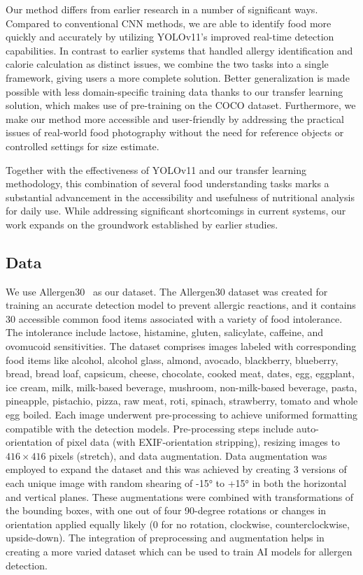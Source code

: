 \documentclass[10pt,twocolumn,letterpaper]{article}
\begin{document}
Our method differs from earlier research in a number of significant ways. Compared to conventional CNN methods, we are able to identify food more quickly and accurately by utilizing YOLOv11's\cite{redmon2016lookonceunifiedrealtime} improved real-time detection capabilities. 
In contrast to earlier systems that handled allergy identification and calorie calculation as distinct issues, we combine the two tasks into a single framework, giving users a more complete solution. 
Better generalization is made possible with less domain-specific training data thanks to our transfer learning solution, which makes use of pre-training on the COCO\cite{lin2015microsoftcococommonobjects} dataset. 
Furthermore, we make our method more accessible and user-friendly by addressing the practical issues of real-world food photography without the need for reference objects or controlled settings for size estimate.

Together with the effectiveness of YOLOv11 and our transfer learning methodology, this combination of several food understanding tasks marks a substantial advancement in the accessibility and usefulness of nutritional analysis for daily use. 
While addressing significant shortcomings in current systems, our work expands on the groundwork established by earlier studies.

\subsection{Data}

We use Allergen30~\cite{mishra2022allergen30} as our dataset.
The Allergen30 dataset was created for training an accurate detection model to prevent allergic reactions, and it contains 30 accessible common food items associated with a variety of food intolerance. 
The intolerance include lactose, histamine, gluten, salicylate, caffeine, and ovomucoid sensitivities.
The dataset comprises images labeled with corresponding food items like alcohol, alcohol glass, almond, avocado, blackberry, blueberry, bread, bread loaf, capsicum, cheese, chocolate, cooked meat, dates, egg, eggplant, ice cream, milk, milk-based beverage, mushroom, non-milk-based beverage, pasta, pineapple, pistachio, pizza, raw meat, roti, spinach, strawberry, tomato and whole egg boiled. 
Each image underwent pre-processing to achieve uniformed formatting compatible with the detection models. 
Pre-processing steps include auto-orientation of pixel data (with EXIF-orientation stripping), resizing images to $416 \times 416$ pixels (stretch), and data augmentation. Data augmentation was employed to expand the dataset and this was achieved by creating 3 versions of each unique image with random shearing of -15° to +15° in both the horizontal and vertical planes. 
These augmentations were combined with transformations of the bounding boxes, with one out of four 90-degree rotations or changes in orientation applied equally likely (0 for no rotation, clockwise, counterclockwise, upside-down). 
The integration of preprocessing and augmentation helps in creating a more varied dataset which can be used to train AI models for allergen detection.
\end{document}
